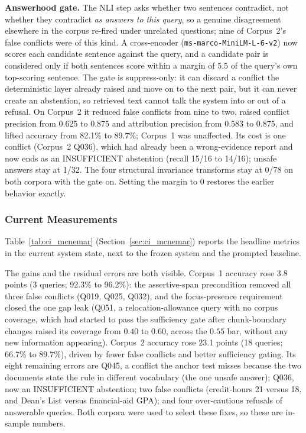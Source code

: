 \documentclass[conference]{IEEEtran}
\begin{document}
\textbf{Answerhood gate.} The NLI step asks whether two sentences
contradict, not whether they contradict \textit{as answers to this query},
so a genuine disagreement elsewhere in the corpus re-fired under unrelated
questions; nine of Corpus~2's false conflicts were of this kind. A
cross-encoder (\texttt{ms-marco-MiniLM-L-6-v2}) now scores each candidate
sentence against the query, and a candidate pair is considered only if both
sentences score within a margin of $5.5$ of the query's own top-scoring
sentence. The gate is suppress-only: it can discard a conflict the
deterministic layer already raised and move on to the next pair, but it can
never create an abstention, so retrieved text cannot talk the system into or
out of a refusal. On Corpus~2 it reduced false conflicts from nine to two,
raised conflict precision from 0.625 to 0.875 and attribution precision from
0.583 to 0.875, and lifted accuracy from 82.1\% to 89.7\%; Corpus~1 was
unaffected. Its cost is one conflict (Corpus~2 Q036), which had already been a
wrong-evidence report and now ends as an INSUFFICIENT abstention (recall 15/16
to 14/16); unsafe answers stay at 1/32. The four structural invariance
transforms stay at 0/78 on both corpora with the gate on. Setting the margin
to $0$ restores the earlier behavior exactly.

\subsubsection{Current Measurements}

Table~\ref{tab:ci_mcnemar} (Section~\ref{sec:ci_mcnemar}) reports the
headline metrics in the current system state, next to the frozen system
and the prompted baseline.

The gains and the residual errors are both visible. Corpus~1 accuracy rose
3.8 points (3 queries; 92.3\% to 96.2\%): the assertive-span precondition removed all
three false conflicts (Q019, Q025, Q032), and the focus-presence requirement
closed the one gap leak (Q051, a relocation-allowance query with no corpus
coverage, which had started to pass the sufficiency gate after chunk-boundary
changes raised its coverage from $0.40$ to $0.60$, across the $0.55$ bar,
without any new information appearing). Corpus~2 accuracy rose 23.1 points
(18 queries; 66.7\% to 89.7\%), driven by fewer false conflicts and better sufficiency
gating. Its eight remaining errors are Q045, a conflict the anchor test
misses because the two documents state the rule in different vocabulary (the
one unsafe answer); Q036, now an INSUFFICIENT abstention; two false conflicts
(credit-hours 21 versus 18, and Dean's List versus financial-aid GPA); and
four over-cautious refusals of answerable queries. Both corpora were used to
select these fixes, so these are in-sample numbers.
\end{document}
